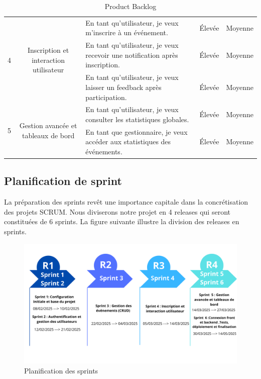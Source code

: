 \begin{table}[h!]
\renewcommand{\arraystretch}{1.6}
\setlength{\tabcolsep}{5pt}
\centering
\begin{tabular}{|c|c|m{7cm}|c|c|}
\hline
\multirow{3}{*}{4} & \multirow{3}{*}{\parbox{3cm}{\centering Inscription et interaction utilisateur}} 
& En tant qu’utilisateur, je veux m’inscrire à un événement. & Élevée & Moyenne \\
\cline{3-5}
& & En tant qu’utilisateur, je veux recevoir une notification après inscription. & Élevée & Moyenne \\
\cline{3-5}
& & En tant qu’utilisateur, je veux laisser un feedback après participation. & Élevée & Moyenne \\
\hline
\multirow{3}{*}{5} & \multirow{3}{*}{\parbox{3cm}{\centering Gestion avancée et tableaux de bord}} 
& En tant qu’utilisateur, je veux consulter les statistiques globales. & Élevée & Moyenne \\
\cline{3-5}
& & En tant que gestionnaire, je veux accéder aux statistiques des événements. & Élevée & Moyenne \\
\cline{3-5}
\hline
\end{tabular}
\caption{Product Backlog}
\end{table}

\clearpage
\subsection{Planification de sprint}
La préparation des sprints revêt une importance capitale dans la concrétisation des projets
SCRUM. Nous diviserons notre projet en 4 releases qui seront constituées de 6 sprints. La figure
suivante illustre la division des releases en sprints.
\begin{figure}[H]
    \centering
    \includegraphics[width=0.9\linewidth]{projet/images/diagramme de sequance/images/R1.png}
    \caption{Planification des sprints}
    \label{fig:equipe_scrum}
 \end{figure}

